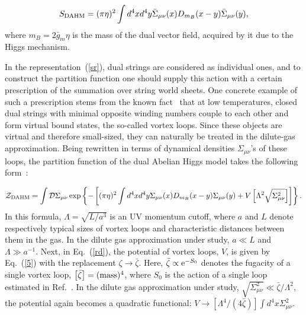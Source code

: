 \documentclass[a4paper,12pt]{article}
\begin{document}
\begin{equation}
\label{sr}
S_{\rm DAHM}=(\pi\eta)^2\int d^4xd^4y\bar\Sigma_{\mu\nu}(x)D_{m_B}(x-y)\bar\Sigma_{\mu\nu}(y),
\end{equation}
where $m_B=2\bar g_m\eta$ is the mass of the dual vector field, acquired by it due to the 
Higgs mechanism. 

In the representation~(\ref{sr}), dual strings are considered as individual ones, and to construct
the partition function one should supply this action with a certain prescription of the summation 
over string world sheets. One concrete example of such a prescription stems from the known fact~\cite{book}  
that at low temperatures, 
closed dual strings with minimal opposite winding numbers couple to each other and 
form virtual bound states, the so-called vortex loops. Since these objects are 
virtual and therefore small-sized, they can naturally be treated in the dilute-gas approximation.
Being rewritten in terms of dynamical densities $\Sigma_{\mu\nu}$'s of these loops, the partition 
function of the dual Abelian Higgs model takes the following form~\cite{ijmpa}:

\begin{equation}
\label{rd}
{\cal Z}_{\rm DAHM}=\int {\cal D}\Sigma_{\mu\nu}\exp\left\{-\left[
(\pi\eta)^2\int d^4xd^4y\Sigma_{\mu\nu}(x)D_{m_B}(x-y)\Sigma_{\mu\nu}(y)+V\left[\Lambda^2
\sqrt{\Sigma_{\mu\nu}^2}\right]\right]
\right\}.
\end{equation}
In this formula, $\Lambda=\sqrt{L/a^3}$ is an UV momentum cutoff, where $a$ and $L$ denote respectively  
typical sizes of vortex loops and characteristic distances between them in the gas.
In the dilute gas approximation under study, $a\ll L$ and $\Lambda\gg a^{-1}$.
Next, in Eq.~(\ref{rd}), the potential of vortex loops, $V$, is given by Eq.~(\ref{5})
with the replacement $\zeta\to\bar\zeta$. Here, $\bar\zeta\propto{\rm e}^{-S_0}$
denotes the fugacity of a single vortex loop, $\left[\bar\zeta\right]=({\rm mass})^4$, where $S_0$
is the action of a single loop estimated in Ref.~\cite{ijmpa}. In the dilute gas approximation
under study, $\sqrt{\Sigma_{\mu\nu}^2}\ll\bar\zeta/\Lambda^2$, the potential again becomes a quadratic
functional: $V\to\left[\Lambda^4/(4\bar\zeta)\right]\int d^4x\Sigma_{\mu\nu}^2$. 
\end{document}
